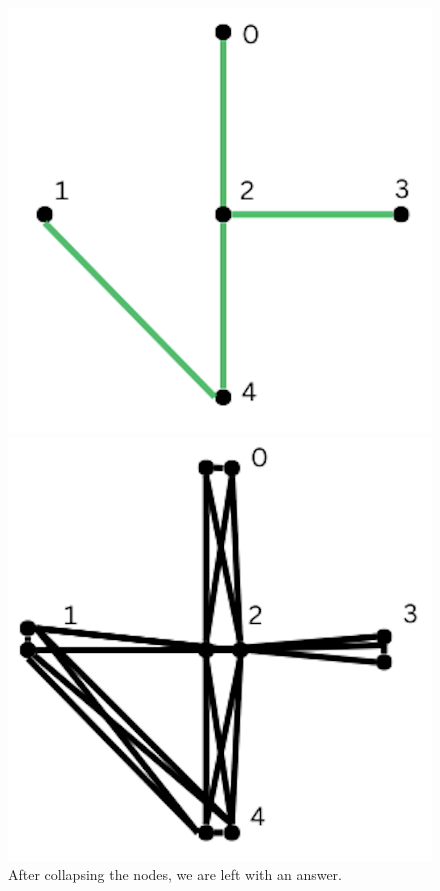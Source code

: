 \documentclass{article}
\begin{document}
\begin{enumerate}
\begin{enumerate}
        \begin{figure}[H]
            \centering
            \begin{minipage}{0.3\textwidth}
                \centering
                \includegraphics[width=\textwidth]{image11.png}
                \caption{After collapsing the nodes, we are left with an answer.}
            \end{minipage}
            \hspace{0.5cm}
            \begin{minipage}{0.3\textwidth}
                \centering
                \includegraphics[width=\textwidth]{image12.png}

\end{minipage}
\end{figure}
\end{enumerate}
\end{enumerate}
\end{document}
